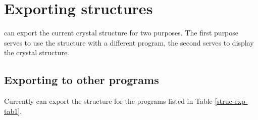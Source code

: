 
\section{Exporting structures \label{struc-expo}}

\Discus can export the current crystal structure for two purposes.
The first purpose serves to use the structure with a different
program, the second serves to display the crystal structure.

\subsection{Exporting to other programs \label{struc-other}}

Currently \Discus can export the structure for the programs 
listed in Table  \ref{struc-exp-tab1}. 


